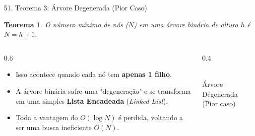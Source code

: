\documentclass[9pt]{beamer}
\newtheorem{teorema}{Teorema}\usepackage{mathtools}
\begin{document}
    \begin{frame}{51. Teorema 3: Árvore Degenerada (Pior Caso)}
        \begin{teorema}
            O número mínimo de nós ($N$) em uma árvore binária de altura $h$ é \textbf{$N = h + 1$}.
        \end{teorema}
        \vspace{0.3cm}
        \begin{columns}
            \begin{column}{0.6\textwidth}
                \begin{itemize}
                    \item Isso acontece quando cada nó tem \textbf{apenas 1 filho}.
                    \item A árvore binária sofre uma "degeneração" e se transforma em uma simples \textbf{Lista Encadeada} (\textit{Linked List}).
                    \item Toda a vantagem do $O(\log N)$ é perdida, voltando a ser uma busca ineficiente $O(N)$.
                \end{itemize}
            \end{column}
            \begin{column}{0.4\textwidth}
                \centering
                \\
                \vspace{0.2cm}
                \tiny Árvore Degenerada (Pior caso)
            \end{column}
        \end{columns}
    \end{frame}
\end{document}
